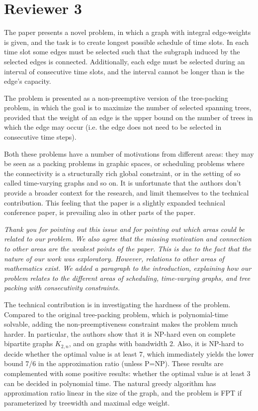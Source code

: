 \documentclass[11pt,a4paper]{article}
\begin{document}
\section*{Reviewer 3}

The paper presents a novel problem, in which a graph with integral edge-weights
is given, and the task is to create longest possible schedule of time slots. In
each time slot some edges must be selected such that the subgraph induced by
the selected edges is connected. Additionally, each edge must be selected
during an interval of consecutive time slots, and the interval cannot be longer
than is the edge's capacity.

The problem is presented as a non-preemptive version of the tree-packing
problem, in which the goal is to maximize the number of selected spanning
trees, provided that the weight of an edge is the upper bound on the number of
trees in which the edge may occur (i.e. the edge does not need to be selected
in consecutive time steps). 

Both these problems have a number of motivations from different areas: they may
be seen as a packing problems in graphic spaces, or scheduling problems where
the connectivity is a structurally rich global constraint, or in the setting of
so called time-varying graphs and so on. It is unfortunate that the authors
don't provide a broader context for the research, and limit themselves to the
technical contribution. This feeling that the paper is a slightly expanded
technical conference paper, is prevailing also in other parts of the paper.

\textit{Thank you for pointing out this issue and for pointing out which areas could be related to our problem. We also agree that the missing motivation and connection to other areas are the weakest points of the paper. This is due to the fact that the nature of our work was exploratory. However, relations to other areas of mathematics exist. We added a paragraph to the introduction, explaining how our problem relates to the different areas of scheduling, time-varying graphs, and tree packing with consecutivity constraints.}

The technical contribution is in investigating the hardness of the problem.
Compared to the original tree-packing problem, which is polynomial-time
solvable, adding the non-preemptiveness constraint makes the problem much
harder.  In particular, the authors show that it is NP-hard even on complete
bipartite graphs $K_{2,n}$, and on graphs with bandwidth 2. Also, it is NP-hard to
decide whether the optimal value is at least 7, which immediately yields the
lower bound 7/6 in the approximation ratio (unless P=NP). These results are
complemented with some positive results: whether the optimal value is at least 3
can be decided in polynomial time. The natural greedy algorithm has
approximation ratio linear in the size of the graph, and the problem is FPT if
parameterized by treewidth and maximal edge weight.
\end{document}

